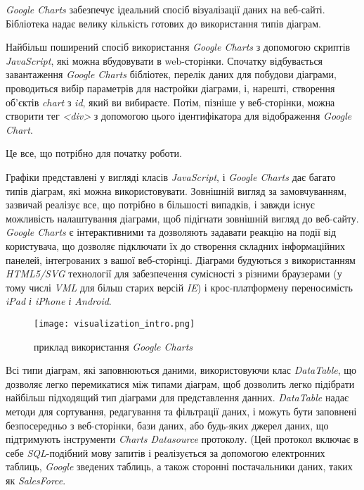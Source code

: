 {\itshape Google Charts} забезпечує ідеальний спосіб візуалізації даних на веб-сайті. Бібліотека надає велику кількість готових до використання типів діаграм.

Найбільш поширений спосіб використання {\itshape Google Charts} з допомогою скриптів {\itshape JavaScript}, які можна вбудовувати в web-сторінки. Спочатку відбувається завантаження {\itshape Google Charts} бібліотек, перелік даних для побудови діаграми, проводиться вибір параметрів для настройки діаграми, і, нарешті, створення об'єктів {\itshape chart} з {\itshape id}, який ви вибираєте. Потім, пізніше у веб-сторінки, можна створити тег {\itshape <div>} з допомогою цього ідентифікатора для відображення {\itshape Google Chart}.

Це все, що потрібно для початку роботи.

Графіки представлені у вигляді класів {\itshape JavaScript}, і {\itshape Google Charts} дає багато типів діаграм, які можна використовувати. Зовнішній вигляд за замовчуванням, зазвичай реалізує все, що потрібно в більшості випадків, і завжди існує можливість  налаштування діаграми, щоб підігнати зовнішній вигляд до веб-сайту. {\itshape Google Charts} є інтерактивними та дозволяють задавати реакцію на події від користувача, що дозволяє підключати їх до створення складних інформаційних панелей, інтегрованих з вашої веб-сторінці. Діаграми будуються з використанням {\itshape HTML5/SVG} технології для забезпечення сумісності з різними браузерами (у тому числі {\itshape VML} для більш старих версій {\itshape IE}) і крос-платформену переносимість {\itshape iPad і iPhone і Android}.

\begin{figure}[h]
    \centering
    \texttt{[image: visualization\_intro.png]}
    \caption{приклад використання {\itshape Google Charts}}
    \label{fig:googlecharts_image}
\end{figure}

Всі типи діаграм, які заповнюються даними, використовуючи клас {\itshape DataTable}, що дозволяє легко перемикатися між типами діаграм, щоб дозволить легко підібрати найбільш підходящий тип діаграми для представлення данних. {\itshape DataTable} надає методи для сортування, редагування та фільтрації даних, і можуть бути заповнені безпосередньо з веб-сторінки, бази даних, або будь-яких джерел даних, що підтримують інструменти {\itshape Charts Datasource} протоколу. (Цей протокол включає в себе {\itshape SQL}-подібний мову запитів і реалізується за допомогою електронних таблиць, {\itshape Google} зведених таблиць, а також сторонні постачальники даних, таких як {\itshape SalesForce}.

